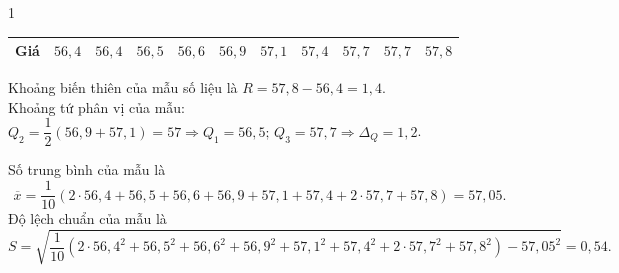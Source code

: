 \begin{bt}
{\begin{enumEX}[a)]{1}
\begin{center}
				\begin{tabular}{|c|c|c|c|c|c|c|c|c|c|c|}
					\hline Giá & $56{,}4$ & $56{,}4$ & $56{,}5$ & $56{,}6$ & $56{,}9$ & $57{,}1$ & $57{,}4$ &$ 57{,}7 $& $57{,}7$ & $57{,}8$\\
					\hline
				\end{tabular}
			\end{center}
			Khoảng biến thiên của mẫu số liệu là $R=57{,}8-56{,}4=1{,}4$.\\
			Khoảng tứ phân vị của mẫu:  $Q_2=\dfrac{1}{2}\left(56{,}9+57{,}1\right)=57\Rightarrow Q_1=56{,}5;\, Q_3=57{,}7\Rightarrow \Delta_Q=1{,}2$.
			\item Số trung bình của mẫu là $$\overline{x}=\dfrac{1}{10}\left(2\cdot 56{,}4+56{,}5+56{,}6+56{,}9+57{,}1+57{,}4+2\cdot 57{,}7+57{,}8\right)=57{,}05.$$
			Độ lệch chuẩn của mẫu là 
			$$S=\sqrt{\dfrac{1}{10}\left(2\cdot 56{,}4^2+56{,}5^2+56{,}6^2+56{,}9^2+57{,}1^2+57{,}4^2+2\cdot 57{,}7^2+57{,}8^2\right)-57{,}05^2}=0{,}54.$$
		\end{enumEX}
	}
\end{bt}

